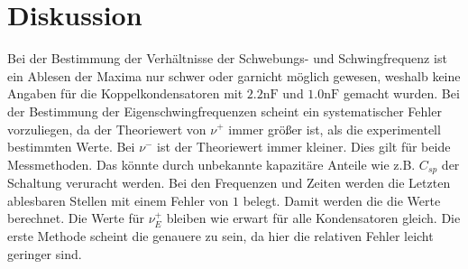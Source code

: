 \section{Diskussion}
\label{sec:Diskussion}
Bei der Bestimmung der Verhältnisse der Schwebungs- und Schwingfrequenz ist ein
Ablesen der Maxima nur schwer oder garnicht möglich gewesen, weshalb keine Angaben
für die Koppelkondensatoren mit $2.2\si{\nano\farad}$ und $1.0\si{\nano\farad}$
gemacht wurden.
Bei der Bestimmung der Eigenschwingfrequenzen scheint ein systematischer Fehler
vorzuliegen, da der Theoriewert von $\nu^{+}$ immer größer ist, als die experimentell
bestimmten Werte. Bei $\nu^{-}$ ist der Theoriewert immer kleiner. Dies gilt für
beide Messmethoden. Das könnte durch unbekannte kapazitäre Anteile wie z.B. $C_{sp}$
der Schaltung veruracht werden. Bei den Frequenzen und Zeiten werden die Letzten
ablesbaren Stellen mit einem Fehler von $1$ belegt. Damit werden die die Werte
berechnet.
Die Werte für $\nu_E^+$ bleiben wie erwart für alle Kondensatoren gleich.
Die erste Methode scheint die genauere zu sein, da hier die relativen
Fehler leicht geringer sind.
